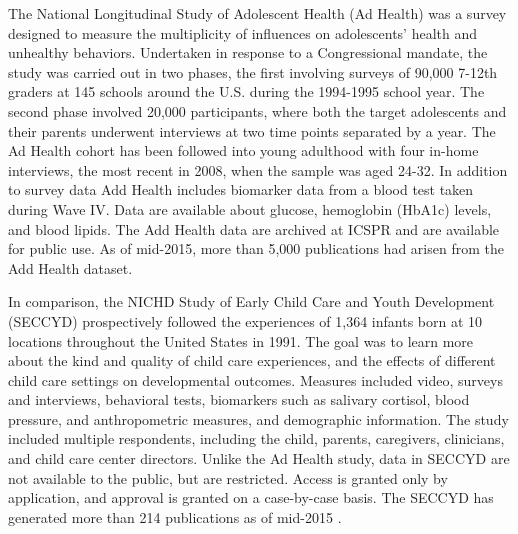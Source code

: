 \documentclass[letterpaper,man,apacite]{apa6}
\begin{document}
The National Longitudinal Study of Adolescent Health (Ad Health) \cite{adolescent_health} was a survey designed to measure the multiplicity of influences on adolescents' health and unhealthy behaviors. 
Undertaken in response to a Congressional mandate, the study was carried out in two phases, the first involving surveys of 90,000 7-12th graders at 145 schools around the U.S. during the 1994-1995 school year. 
The second phase involved 20,000 participants, where both the target adolescents and their parents underwent interviews at two time points separated by a year. 
The Ad Health cohort has been followed into young adulthood with four in-home interviews, the most recent in 2008, when the sample was aged 24-32. 
In addition to survey data Add Health includes biomarker data from a blood test taken during Wave IV. 
Data are available about glucose, hemoglobin (HbA1c) levels, and blood lipids. 
The Add Health data \cite{harris_add_health} are archived at ICSPR \cite{ICPSR} and are available for public use.
As of mid-2015, more than 5,000 publications \cite{add_health_publications} had arisen from the Add Health dataset.

In comparison, the NICHD Study of Early Child Care and Youth Development (SECCYD) prospectively followed the experiences of 1,364 infants born at 10 locations throughout the United States in 1991.
The goal was to learn more about the kind and quality of child care experiences, and the effects of different child care settings on developmental outcomes. 
Measures included video, surveys and interviews, behavioral tests, biomarkers such as salivary cortisol, blood pressure, and anthropometric measures, and demographic information.
The study included multiple respondents, including the child, parents, caregivers, clinicians, and child care center directors.
Unlike the Ad Health study, data in SECCYD are not available to the public, but are restricted.
Access is granted only by application, and approval is granted on a case-by-case basis.
The SECCYD has generated more than 214 publications as of mid-2015 \cite{seccyd_publications}.
\end{document}
